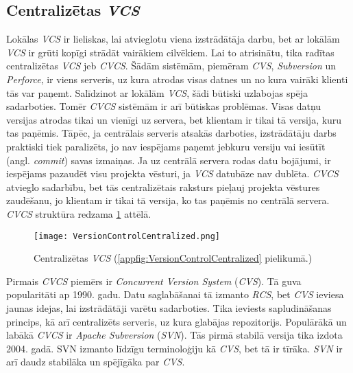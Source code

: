 \subsection{Centralizētas \textit{VCS}}
Lokālas \textit{VCS} ir lieliskas, lai atvieglotu viena izstrādātāja darbu, bet ar lokālām \textit{VCS} ir grūti kopīgi strādāt vairākiem cilvēkiem. Lai to atrisinātu, tika radītas centralizētas \textit{VCS} jeb \textit{CVCS}. Šādām sistēmām, piemēram \textit{CVS}, \textit{Subversion} un \textit{Perforce}, ir viens serveris, uz kura atrodas visas datnes un no kura vairāki klienti tās var paņemt. Salīdzinot ar lokālām \textit{VCS}, šādi būtiski uzlabojas spēja sadarboties. Tomēr \textit{CVCS} sistēmām ir arī būtiskas problēmas. Visas datņu versijas atrodas tikai un vienīgi uz servera, bet klientam ir tikai tā versija, kuru tas paņēmis. Tāpēc, ja centrālais serveris atsakās darboties, izstrādātāju darbs praktiski tiek paralizēts, jo nav iespējams paņemt jebkuru versiju vai iesūtīt (angl. \textit{commit}) savas izmaiņas. Ja uz centrālā servera rodas datu bojājumi, ir iespējams pazaudēt visu projekta vēsturi, ja \textit{VCS} datubāze nav dublēta.
\textit{CVCS} atvieglo sadarbību, bet tās centralizētais raksturs pieļauj projekta vēstures zaudēšanu, jo klientam ir tikai tā versija, ko tas paņēmis no centrālā servera. \textit{CVCS} struktūra redzama \ref{fig:VersionControlCentralized} attēlā. \cite{chacon2014progit}
\begin{figure}[H]%
	\centering
	\captionsetup{justification=centering}
	\texttt{[image: VersionControlCentralized.png]}
	\caption{Centralizētas \textit{VCS} (\ref{appfig:VersionControlCentralized} pielikumā.)}
	\label{fig:VersionControlCentralized}
\end{figure}
Pirmais \textit{CVCS} piemērs ir \textit{Concurrent Version System} (\textit{CVS}). Tā guva popularitāti ap 1990. gadu. Datu saglabāšanai tā izmanto \textit{RCS}, bet \textit{CVS} ieviesa jaunas idejas, lai izstrādātāji varētu sadarboties. Tika ieviests sapludināšanas princips, kā arī centralizēts serveris, uz kura glabājas repozitorijs.
Populārākā un labākā \textit{CVCS} ir \textit{Apache Subversion} (\textit{SVN}). Tās pirmā stabilā versija tika izdota 2004. gadā. SVN izmanto līdzīgu terminoloģiju kā \textit{CVS}, bet tā ir tīrāka. \textit{SVN} ir arī daudz stabilāka un spējīgāka par \textit{CVS}.
\cite{raymondVCS}

